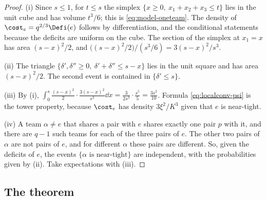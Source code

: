 \begin{proof}
(i) Since $s\le1$, for $t\le s$ the simplex $\{x\ge0,\ x_1+x_2+x_3\le t\}$ lies in the unit
cube and has volume $t^3/6$; this is \eqref{eq:model-oneteam}. The density of
$\cost_e=q^{2/3}\Defi(e)$ follows by differentiation, and the conditional statements because
the deficits are uniform on the cube. The section of the simplex at $x_1=x$ has area
$(s-x)^2/2$, and $\bigl((s-x)^2/2\bigr)/(s^3/6)=3(s-x)^2/s^3$.

(ii) The triangle $\{\delta',\delta''\ge0,\ \delta'+\delta''\le s-x\}$ lies in the unit
square and has area $(s-x)^2/2$. The second event is contained in $\{\delta'\le s\}$.

(iii) By (i), $\int_0^s\frac{(s-x)^2}2\cdot\frac{3(s-x)^2}{s^3}\dd x=\frac{3}{2s^3}\cdot
\frac{s^5}{5}=\frac{3s^2}{10}$. Formula \eqref{eq:localconv-psi} is the tower property,
because $\cost_e$ has density $3\xi^2/K^3$ given that $e$ is near-tight.

(iv) A team $\alpha\ne e$ that shares a pair with $e$ shares exactly one pair $p$ with it,
and there are $q-1$ such teams for each of the three pairs of $e$. The other two pairs of
$\alpha$ are not pairs of $e$, and for different $\alpha$ these pairs are different. So,
given the deficits of $e$, the events $\{\alpha\text{ is near-tight}\}$ are independent,
with the probabilities given by (ii). Take expectations with (iii).
\end{proof}

\subsection{The theorem}\label{sec:localconv-theorem}

